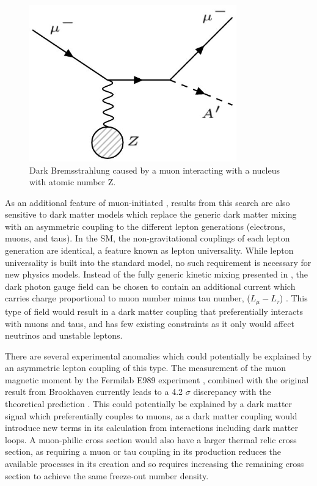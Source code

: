 \begin{figure}[ht]
	\centering
	\label{fig:dbrem_feyn}
	\includegraphics[width=0.8\textwidth]{figures/dbrem_feyn_diagram.jpg}
        \caption[Dark Bremsstrahlung Feynman Diagram]{Dark Bremsstrahlung caused by a muon interacting with a nucleus with atomic number Z.}
\end{figure}

As an additional feature of muon-initiated \dbrem, results from this search are also sensitive to dark matter models which replace the generic dark matter mixing with an asymmetric coupling to the different lepton generations (electrons, muons, and taus).
In the SM, the non-gravitational couplings of each lepton generation are identical, a feature known as lepton universality.
While lepton universality is built into the standard model, no such requirement is necessary for new physics models. 
Instead of the fully generic kinetic mixing presented in , the dark photon gauge field can be chosen to contain an additional current which carries charge proportional to muon number minus tau number, ($L_\mu - L_\tau$) \cite{neut_trident}.
This type of field would result in a dark matter coupling that preferentially interacts with muons and taus, and has few existing constraints as it only would affect neutrinos and unstable leptons.

There are several experimental anomalies which could potentially be explained by an asymmetric lepton coupling of this type.
The measurement of the muon magnetic moment by the Fermilab E989 experiment \cite{gminus2}, combined with the original result from Brookhaven \cite{gminus2_bnl} currently leads to a 4.2 $\sigma$ discrepancy with the theoretical prediction \cite{gminus2_theory}. 
This could potentially be explained by a dark matter signal which preferentially couples to muons, as a dark matter coupling would introduce new terms in its calculation from interactions including dark matter loops.
A muon-philic cross section would also have a larger thermal relic cross section, as requiring a muon or tau coupling in its production reduces the available processes in its creation and so requires increasing the remaining cross section to achieve the same freeze-out number density.


